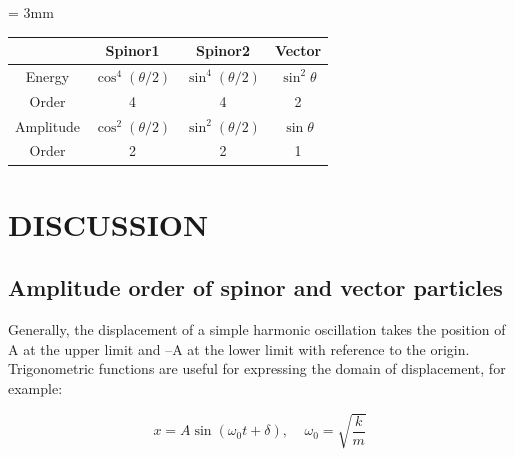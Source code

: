 \documentclass[%
 reprint,
 amsmath,amssymb,
 aps,
]{revtex4-1}
\numberwithin{equation}{section}%
\begin{document}
    \begin{center}
        \begin{threeparttable}
            \caption{Order of each particles. ($E \propto A^{2}$)}
            \label{table_2}
            \tabcolsep = 3mm
            \renewcommand\arraystretch{1.8}
            \begin{tabular}{cccc}
                \hline
                    & Spinor1 & Spinor2 & Vector \\
                \hline
                Energy & $\cos^{4} (\theta /2)$ & $\sin^{4} (\theta /2)$ & $\sin^{2} \theta$ \\
                Order & 4 & 4 & 2 \\
                \hline
                Amplitude & $\cos^{2} (\theta /2)$ & $\sin^{2} (\theta /2)$ & $\sin \theta$ \\
                Order & 2 & 2 & 1 \\
                \hline
            \end{tabular}
        \end{threeparttable}
    \end{center}


\section{\label{sec:DISCUSSION}DISCUSSION}


\subsection{\label{sub:Amplitude order of spinor and vector particles}Amplitude order of spinor and vector particles}


    Generally, the displacement of a simple harmonic oscillation takes the position of A at the upper limit and --A at the lower limit with reference to the origin. Trigonometric functions are useful for expressing the domain of displacement, for example:

    \begin{equation}
        x = A \sin (\omega_{\mathrm{0}} t + \delta), \ \ \ \ \  \omega_{\mathrm{0}} = \sqrt{\frac{k}{m}}
        \label{e_Simple_H_Osc}
    \end{equation}
    
\end{document}
